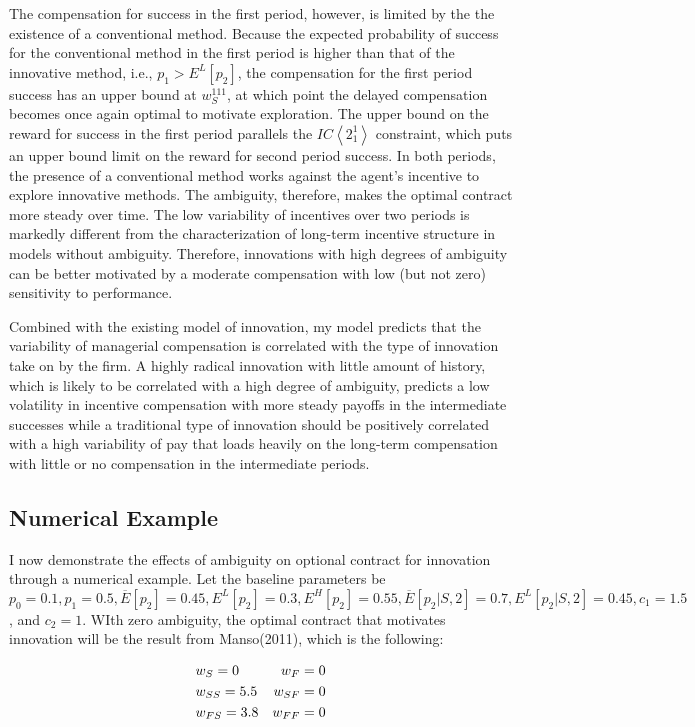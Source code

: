 \documentclass[11pt]{article} %
\theoremstyle{exampstyle}
\newcommand{\eq}[1]{\begin{align}#1\end{align}}
\newcommand{\la}{ \left < }
\newcommand{\ra}{ \right > }
\begin{document}
The compensation for success in the first period, however, is limited by the the existence of a conventional method. Because the expected probability of success for the conventional method in the first period is higher than that of the innovative method, i.e., $p_1 > E^L[p_2]$, the compensation for the first period success has an upper bound at $w^{111}_S$, at which point the delayed compensation becomes once again optimal to motivate exploration. The upper bound on the reward for success in the first period parallels the $IC \la 2^1_1 \ra$ constraint, which puts an upper bound limit on the reward for second period success. In both periods, the presence of a conventional method works against the agent's incentive to explore innovative methods. The ambiguity, therefore, makes the optimal contract more steady over time. The low variability of incentives over two periods is markedly different from the characterization of long-term incentive structure in models without ambiguity. Therefore, innovations with high degrees of ambiguity can be better motivated by a moderate compensation with low (but not zero) sensitivity to performance. 

Combined with the existing model of innovation, my model predicts that the variability of managerial compensation is correlated with the type of innovation take on by the firm. A highly radical innovation with little amount of history, which is likely to be correlated with a high degree of ambiguity, predicts a low volatility in incentive compensation with more steady payoffs in the intermediate successes while a traditional type of innovation should be positively correlated with a high variability of pay that loads heavily on the long-term compensation with little or no compensation in the intermediate periods.

\subsection{Numerical Example}
I now demonstrate the effects of ambiguity on optional contract for innovation through a numerical example. Let the baseline parameters be $p_0=0.1, p_1=0.5, \overline{E}[p_2]=0.45, E^L[p_2]=0.3, E^H[p_2]=0.55, \overline{E}[p_2|S,2]=0.7, E^L[p_2|S,2]=0.45, c_1=1.5$, and $c_2=1$. WIth zero ambiguity, the optimal contract that motivates innovation  will be the result from Manso(2011), which is the following:

\eq{
&w_S = 0  &w_F=0 \notag \\
&w_{SS} = 5.5  &w_{SF}=0 \notag \\
&w_{FS} = 3.8 &w_{FF}=0 \notag 
}
\end{document}
